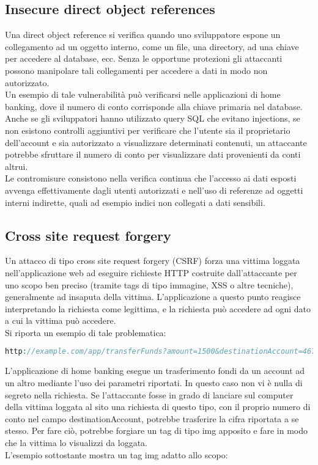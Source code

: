 \subsection{Insecure direct object references}
Una direct object reference si verifica quando uno sviluppatore espone un collegamento ad un oggetto interno, come un file, una directory, ad una chiave per accedere al database, ecc. Senza le opportune protezioni gli attaccanti possono manipolare tali collegamenti per accedere a dati in modo non autorizzato.\\
Un esempio di tale vulnerabilità può verificarsi nelle applicazioni di home banking, dove il numero di conto corrisponde alla chiave primaria nel database. Anche se gli sviluppatori hanno utilizzato query SQL che evitano injections, se non esistono controlli aggiuntivi per verificare che l'utente sia il proprietario dell'account e sia autorizzato a visualizzare determinati contenuti, un attaccante potrebbe sfruttare il numero di conto per visualizzare dati provenienti da conti altrui.\\
Le contromisure consistono nella verifica continua che l'accesso ai dati esposti avvenga effettivamente dagli utenti autorizzati e nell'uso di referenze ad oggetti interni indirette, quali ad esempio indici non collegati a dati sensibili. 

\subsection{Cross site request forgery}
Un attacco di tipo cross site request forgery (CSRF) forza una vittima loggata nell'applicazione web ad eseguire richieste HTTP costruite dall'attaccante per uno scopo ben preciso (tramite tags di tipo immagine, XSS o altre tecniche), generalmente ad insaputa della vittima. L'applicazione a questo punto reagisce interpretando la richiesta come legittima, e la richiesta può accedere ad ogni dato a cui la vittima può accedere.\\
Si riporta un esempio di tale problematica:

\begin{lstlisting}[language=PHP]
http://example.com/app/transferFunds?amount=1500&destinationAccount=4673243243
\end{lstlisting}

L'applicazione di home banking esegue un trasferimento fondi da un account ad un altro mediante l'uso dei parametri riportati. In questo caso non vi è nulla di segreto nella richiesta. Se l'attaccante fosse in grado di lanciare sul computer della vittima loggata al sito una richiesta di questo tipo, con il proprio numero di conto nel campo destinationAccount, potrebbe trasferire la cifra riportata a se stesso. Per fare ciò, potrebbe forgiare un tag di tipo img apposito e fare in modo che la vittima lo visualizzi da loggata.\\
L'esempio sottostante mostra un tag img adatto allo scopo:

